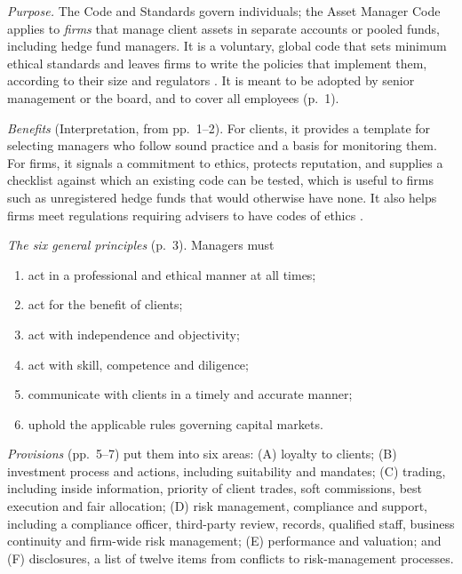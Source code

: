 \begin{qfdefinition}\label{def:asset-manager-code}
 \emph{Purpose.} The Code and Standards govern individuals; the Asset Manager Code applies to \emph{firms} that manage client assets in separate accounts or pooled funds, including hedge fund managers. It is a voluntary, global code that sets minimum ethical standards and leaves firms to write the policies that implement them, according to their size and regulators \citep[pp.~1--2]{asset-manager-code-2010}. It is meant to be adopted by senior management or the board, and to cover all employees (p.~1).

\emph{Benefits} (Interpretation, from pp.~1--2). For clients, it provides a template for selecting managers who follow sound practice and a basis for monitoring them. For firms, it signals a commitment to ethics, protects reputation, and supplies a checklist against which an existing code can be tested, which is useful to firms such as unregistered hedge funds that would otherwise have none. It also helps firms meet regulations requiring advisers to have codes of ethics \citep[p.~xi]{standards-practice-handbook-2024}.

\emph{The six general principles} (p.~3). Managers must
\begin{enumerate}
\item act in a professional and ethical manner at all times;
\item act for the benefit of clients;
\item act with independence and objectivity;
\item act with skill, competence and diligence;
\item communicate with clients in a timely and accurate manner;
\item uphold the applicable rules governing capital markets.
\end{enumerate}
\emph{Provisions} (pp.~5--7) put them into six areas: (A) loyalty to clients; (B) investment process and actions, including suitability and mandates; (C) trading, including inside information, priority of client trades, soft commissions, best execution and fair allocation; (D) risk management, compliance and support, including a compliance officer, third-party review, records, qualified staff, business continuity and firm-wide risk management; (E) performance and valuation; and (F) disclosures, a list of twelve items from conflicts to risk-management processes.


\end{qfdefinition}
